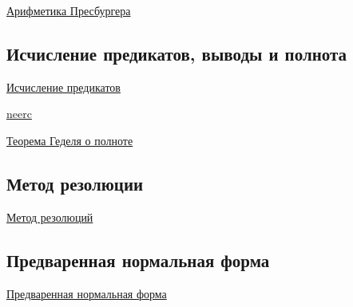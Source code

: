 \documentclass{article}
\begin{document}
\href{https://ru.wikipedia.org/wiki/%D0%90%D1%80%D0%B8%D1%84%D0%BC%D0%B5%D1%82%D0%B8%D0%BA%D0%B0_%D0%9F%D1%80%D0%B5%D1%81%D0%B1%D1%83%D1%80%D0%B3%D0%B5%D1%80%D0%B0}{Арифметика Пресбургера}

\subsection{Исчисление предикатов, выводы и полнота}

\href{https://matica.org.ua/metodichki-i-knigi-po-matematike/matematicheskaia-logika-i-teoriia-algoritmov/6-ischislenie-predikatov}{Исчисление предикатов}

\href{https://neerc.ifmo.ru/wiki/index.php?title=%D0%98%D1%81%D1%87%D0%B8%D1%81%D0%BB%D0%B5%D0%BD%D0%B8%D0%B5_%D0%BF%D1%80%D0%B5%D0%B4%D0%B8%D0%BA%D0%B0%D1%82%D0%BE%D0%B2}{neerc}

\href{https://ru.wikipedia.org/wiki/%D0%A2%D0%B5%D0%BE%D1%80%D0%B5%D0%BC%D0%B0_%D0%93%D1%91%D0%B4%D0%B5%D0%BB%D1%8F_%D0%BE_%D0%BF%D0%BE%D0%BB%D0%BD%D0%BE%D1%82%D0%B5#:~:text=%D0%A2%D0%B5%D0%BE%D1%80%D0%B5%CC%81%D0%BC%D0%B0%20%D0%93%D1%91%D0%B4%D0%B5%D0%BB%D1%8F%20%D0%BE%20%D0%BF%D0%BE%D0%BB%D0%BD%D0%BE%D1%82%D0%B5%CC%81%20%D0%B8%D1%81%D1%87%D0%B8%D1%81%D0%BB%D0%B5%CC%81%D0%BD%D0%B8%D1%8F,%D0%B4%D0%BE%D0%BA%D0%B0%D0%B7%D0%B0%D0%BD%D0%B0%20%D0%9A%D1%83%D1%80%D1%82%D0%BE%D0%BC%20%D0%93%D1%91%D0%B4%D0%B5%D0%BB%D0%B5%D0%BC%20%D0%B2%201929.}{Теорема Геделя о полноте}

\subsection{Метод резолюции}

\href{https://denchick.github.io/logic4humans/chapter3.html}{Метод резолюций}

\subsection{Предваренная нормальная форма}

\href{http://www.alex111007.ru/book/dm/zan/z24/z24v03.htm#:~:text=%D0%93%D0%BE%D0%B2%D0%BE%D1%80%D1%8F%D1%82%2C%20%D1%87%D1%82%D0%BE%20%D1%84%D0%BE%D1%80%D0%BC%D1%83%D0%BB%D0%B0%20%D0%BB%D0%BE%D0%B3%D0%B8%D0%BA%D0%B8%20%D0%BF%D1%80%D0%B5%D0%B4%D0%B8%D0%BA%D0%B0%D1%82%D0%BE%D0%B2,%D0%BE%D1%82%D1%80%D0%B8%D1%86%D0%B0%D0%BD%D0%B8%D1%8F%20%D0%BE%D1%82%D0%BD%D0%B5%D1%81%D0%B5%D0%BD%D0%B0%20%D0%BA%20%D1%8D%D0%BB%D0%B5%D0%BC%D0%B5%D0%BD%D1%82%D0%B0%D1%80%D0%BD%D1%8B%D0%BC%20%D1%84%D0%BE%D1%80%D0%BC%D1%83%D0%BB%D0%B0%D0%BC.&text=xi%20%D0%B8%D0%BB%D0%B8%20xi%20%2C%20%D0%B0%20%D1%84%D0%BE%D1%80%D0%BC%D1%83%D0%BB%D0%B0%20%D0%90%20%D0%BA%D0%B2%D0%B0%D0%BD%D1%82%D0%BE%D1%80%D0%BE%D0%B2%20%D0%BD%D0%B5%20%D1%81%D0%BE%D0%B4%D0%B5%D1%80%D0%B6%D0%B8%D1%82.&text=%D0%A2%D0%B5%D0%BE%D1%80%D0%B5%D0%BC%D0%B0.}{Предваренная нормальная форма}
\end{document}

